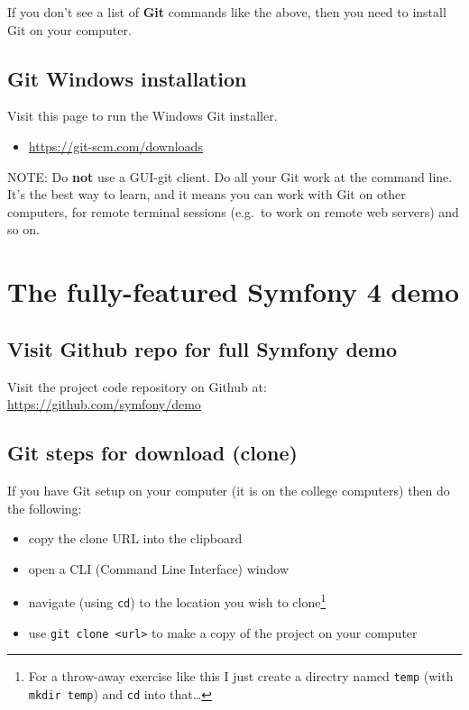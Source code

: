 \documentclass[a4paperpaper,openright]{book}
\providecommand{\tightlist}{%
  \setlength{\itemsep}{0pt}\setlength{\parskip}{0pt}}
\begin{document}
If you don't see a list of \textbf{Git} commands like the above, then
you need to install Git on your computer.

\hypertarget{git-windows-installation}{%
\section{Git Windows installation}\label{git-windows-installation}}

Visit this page to run the Windows Git installer.

\begin{itemize}
\tightlist
\item
  \url{https://git-scm.com/downloads}
\end{itemize}

NOTE: Do \textbf{not} use a GUI-git client. Do all your Git work at the
command line. It's the best way to learn, and it means you can work with
Git on other computers, for remote terminal sessions (e.g.~to work on
remote web servers) and so on.

\hypertarget{the-fully-featured-symfony-4-demo}{%
\chapter{\texorpdfstring{The fully-featured Symfony 4
demo\label{appendix_sf_demo}}{The fully-featured Symfony 4 demo}}\label{the-fully-featured-symfony-4-demo}}

\hypertarget{visit-github-repo-for-full-symfony-demo}{%
\section{Visit Github repo for full Symfony
demo}\label{visit-github-repo-for-full-symfony-demo}}

Visit the project code repository on Github at:
\url{https://github.com/symfony/demo}

\hypertarget{git-steps-for-download-clone}{%
\section{Git steps for download
(clone)}\label{git-steps-for-download-clone}}

If you have Git setup on your computer (it is on the college computers)
then do the following:

\begin{itemize}
\item
  copy the clone URL into the clipboard
\item
  open a CLI (Command Line Interface) window
\item
  navigate (using \texttt{cd}) to the location you wish to
  clone\footnote{For a throw-away exercise like this I just create a
    directry named \texttt{temp} (with \texttt{mkdir\ temp}) and
    \texttt{cd} into that\ldots{}}
\item
  use \texttt{git\ clone\ \textless{}url\textgreater{}} to make a copy
  of the project on your computer
\end{itemize}
\end{document}
